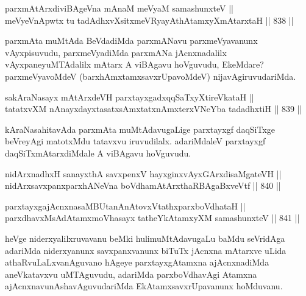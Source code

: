 
\begin{shl}
parxmAtArxdiviBAgeVna mAnaM meVyaM samashunxteV || \\
meVyeVnA\s \s pwtx tu tadAdhxvXsitxmeVRyayAthAtamxyXmAtarxtaH \hfill || 838 ||  
\end{shl}

\begin{artha}
parxmAta muMtAda BeVdadiMda parxmANavu parxmeVyavanunx vAyxpisuvudu, parxmeVyadiMda parxmANa jAcnxnadalilx vAyxpaneyuMTAdalilx mAtarx A viBAgavu hoVguvudu, EkeMdare? parxmeVyavoMdeV (barxhAmxtamxsavxrUpavoMdeV) nijavAgiruvudariMda.
\end{artha}

\begin{shl}
sakAraNasayx mAtArxdeVH parxtayxgadxqqSaTxyXtireVkataH || \\
tatatxvXM nAnayxdayxtasatxsAmxtatxnAmxterxVNeYba tadadhxtiH \hfill || 839 ||  
\end{shl}

\begin{artha}
kAraNasahitavAda parxmAta muMtAdavugaLige parxtayxgf daqSiTxge beVreyAgi matotxMdu tatavxvu iruvudilalx. adariMdaleV parxtayxgf daqSiTxmAtarxdiMdale A viBAgavu hoVguvudu.
\end{artha}


\begin{shl}
nidArxnadhxH sanayxthA savxpenxV hayxginxvAyxGArxdisaMgateVH || \\
nidArxsavxpanxparxhANeVna boVdhamAtArxthaRBAgaBxveVtf \hfill || 840 ||  
\end{shl}
				
\begin{shl}
parxtayxgajAcnxnasaMBUtanAnAtovxVtathxparxboVdhataH || \\
parxdhavxMsAdAtamxmoVhasayx tatheYkAtamxyXM samashunxteV \hfill || 841 ||  
\end{shl}

\begin{artha}
heVge niderxyalilxruvavanu beMki hulimuMtAdavugaLu baMdu seVridAga adariMda niderxyanunx savxpanxvanunx biTuTx jAcnxna mAtarxve uLida athaRvuLaLxvanAguvano hAgeye parxtayxgAtamxna ajAcnxnadiMda aneVkatavxvu uMTAguvudu, adariMda parxboVdhavAgi Atamxna ajAcnxnavunAshavAguvudariMda EkAtamxsavxrUpavanunx hoMduvanu.
\end{artha}

